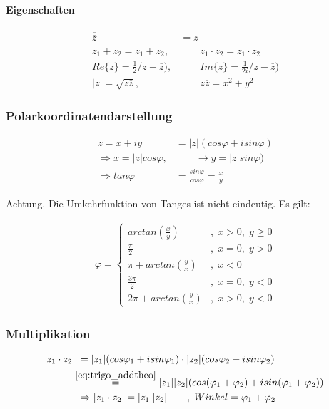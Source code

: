 \documentclass[12pt,a4paper]{report}%
\numberwithin{equation}{section}
\newcommand{\subsubsubsection}{\paragraph}
\numberwithin{equation}{subsection}
\begin{document}
		\subsubsubsection{Eigenschaften}
		\begin{align}
			\overline{\overline{z}} &= z \\
			\overline{z_1 + z_2} = \overline{z_1} + \overline{z_2},&\qquad \overline{z_1 \cdot z_2} = \overline{z_1} \cdot \overline{z_2} \\
			Re\{z\} = \frac{1}{2} /z + \overline{z}), &\qquad Im\{z\} = \frac{1}{2i} /z - \overline{z})\\
			|z| = \sqrt{z \overline{z}}, &\qquad z\overline{z} = x^2 + y^2
		\end{align}
			
		\subsubsection{Polarkoordinatendarstellung}
		\begin{align}
			z = x + iy &= |z|(cos\varphi + isin\varphi)\\
			\Rightarrow x = |z| cos\varphi, &\qquad \rightarrow y = |z| sin\varphi) \nonumber\\
			\Rightarrow tan \varphi &= \frac{sin \varphi}{cos \varphi} = \frac{x}{y}
		\end{align}
		
		Achtung. Die Umkehrfunktion von Tanges ist nicht eindeutig. Es gilt:
		
		\begin{align}
		\varphi = 
		\begin{cases} 
		    arctan(\frac{x}{y}) \qquad &,\; x > 0,\; y\geq 0\\
		    \frac{\pi}{2}  &,\;x = 0,\; y > 0\\
		    \pi + arctan(\frac{y}{x}) &,\; x < 0\\
		    \frac{3\pi}{2} &,\; x=0,\;y< 0\\
		    2\pi + arctan(\frac{y}{x}) &,\; x> 0,\; y < 0
		\end{cases}
		\end{align}
	
	  \subsubsection{Multiplikation}
	  \begin{align}
	  z_1 \cdot z_2 &\;\; = |z_1|(cos\varphi_1 + isin\varphi_1) \cdot |z_2| (cos\varphi_2 + isin\varphi_2)\\
	  &\overset{\eqref{eq:trigo_addtheo}}{=} |z_1| |z_2| (cos(\varphi_1 + \varphi_2) + isin(\varphi_1 + \varphi_2))\\
	  &\;\; \Rightarrow |z_1 \cdot z_2| = |z_1| |z_2| \qquad ,\; Winkel = \varphi_1 + \varphi_2 \label{eq:zahl_kompl_mult}
	  \end{align}
	  
\end{document}
